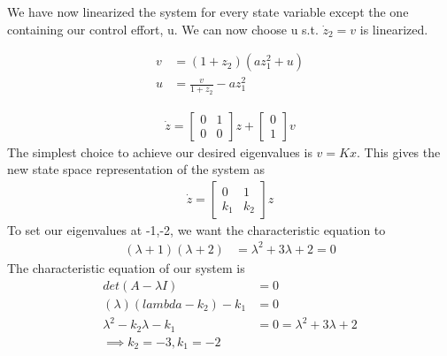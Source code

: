 \documentclass{article}
\begin{document}
  We have now linearized the system for every state variable except the one
  containing our control effort, u. We can now choose u s.t. $\dot{z}_2 = v$ is
  linearized.

  \begin{align*}
    v &= (1+z_2) (az_1^2+u) \\
    u &= \frac{v}{1+z_2} - az_1^2
  \end{align*}
 
  \begin{align*}
    \dot{z} = \begin{bmatrix}
      0 & 1 \\
      0 & 0
    \end{bmatrix}z +
          \begin{bmatrix}
            0 \\
            1
          \end{bmatrix}v
  \end{align*}
  The simplest choice to achieve our desired eigenvalues is $v=Kx$. This
  gives the new state space representation of the system as
  \begin{align*}
    \dot{z} = \begin{bmatrix}
      0 & 1 \\
      k_1 & k_2
    \end{bmatrix}z
  \end{align*}
  To set our eigenvalues at -1,-2, we want the characteristic equation to
  \begin{align*}
    (\lambda + 1)(\lambda + 2) &= \lambda^2 + 3\lambda + 2 = 0
  \end{align*}
  The characteristic equation of our system is
  \begin{align*}
    det(A-\lambda I) &= 0 \\
    (\lambda)(lambda-k_2) - k_1 &=0 \\
    \lambda^2 - k_2\lambda -k_1 &= 0 = \lambda^2 + 3\lambda + 2 \\
    \implies k_2 = -3, k_1 = -2
  \end{align*}
  

  

  
  
\end{document}
